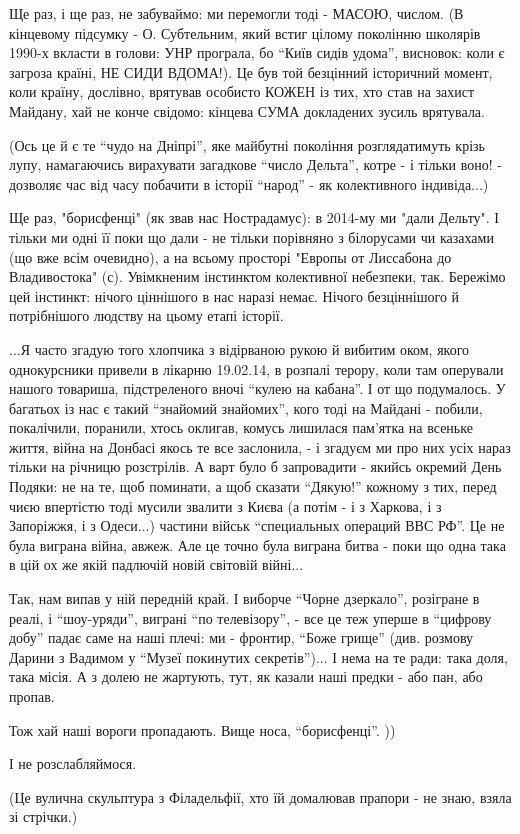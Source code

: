 Ще раз, і ще раз, не забуваймо: ми перемогли тоді - МАСОЮ, числом. (В кінцевому
підсумку - О. Субтельним, який встиг цілому поколінню школярів 1990-х вкласти в
голови: УНР програла, бо \enquote{Київ сидів удома}, висновок: коли є загроза країні,
НЕ СИДИ ВДОМА!). Це був той безцінний історичний момент, коли країну, дослівно,
врятував особисто КОЖЕН із тих, хто став на захист Майдану, хай не конче
свідомо: кінцева СУМА докладених зусиль врятувала. 

(Ось це й є те \enquote{чудо на Дніпрі}, яке майбутні покоління розглядатимуть крізь
лупу, намагаючись вирахувати загадкове \enquote{число Дельта}, котре - і тільки воно! -
дозволяє час від часу побачити в історії \enquote{народ} - як колективного індивіда...)

Ще раз, "борисфенці" (як звав нас Нострадамус): в 2014-му ми "дали Дельту". І
тільки ми одні її поки що дали - не тільки порівняно з білорусами чи казахами
(що вже всім очевидно), а на всьому просторі "Европы от Лиссабона до
Владивостока" (с). Увімкненим інстинктом колективної небезпеки, так. Бережімо
цей інстинкт: нічого ціннішого в нас наразі немає. Нічого безціннішого й
потрібнішого людству на цьому етапі історії.  

...Я часто згадую того хлопчика з відірваною рукою й вибитим оком, якого
однокурсники привели в лікарню 19.02.14, в розпалі терору, коли там оперували
нашого товариша, підстреленого вночі \enquote{кулею на кабана}. І от що подумалось. У
багатьох із нас є такий \enquote{знайомий знайомих}, кого тоді на Майдані - побили,
покалічили, поранили, хтось оклигав, комусь лишилася пам'ятка на всеньке життя,
війна на Донбасі якось те все заслонила, - і згадуєм ми про них усіх нараз
тільки на річницю розстрілів. А варт було б запровадити - якийсь окремий День
Подяки: не на те, щоб поминати, а щоб сказати \enquote{Дякую!} кожному з тих, перед
чиєю впертістю тоді мусили звалити з Києва (а потім - і з Харкова, і з
Запоріжжя, і з Одеси...) частини військ \enquote{специальных операций ВВС РФ}. Це не
була виграна війна, авжеж. Але це точно була виграна битва - поки що одна така
в цій ох же якій падлючій новій світовій війні...

Так, нам випав у ній передній край. І виборче \enquote{Чорне дзеркало}, розігране в
реалі, і \enquote{шоу-уряди}, виграні \enquote{по телевізору}, - все це теж уперше в \enquote{цифрову
добу} падає саме на наші плечі: ми - фронтир, \enquote{Боже грище} (див. розмову Дарини
з Вадимом у \enquote{Музеї покинутих секретів})... І нема на те ради: така доля, така
місія. А з долею не жартують, тут, як казали наші предки - або пан, або пропав. 

Тож хай наші вороги пропадають. Вище носа, \enquote{борисфенці}. ))

І не розслабляймося. 


(Це вулична скульптура з Філадельфії, хто їй домалював прапори - не знаю, взяла
зі стрічки.)

